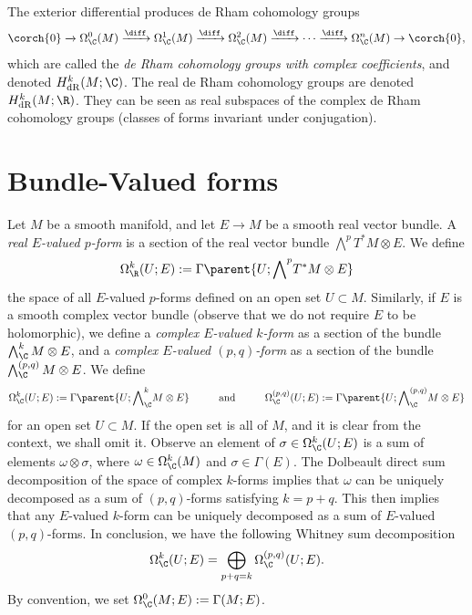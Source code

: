 The exterior differential produces de Rham cohomology groups
\[
\corch{0} \xrightarrow{} \Omega_\C^0(M) \xrightarrow{\diff} \Omega_\C^1(M) \xrightarrow{\diff} \Omega_\C^2(M) \xrightarrow{\diff}\cdots \xrightarrow{\diff} \Omega_\C^n(M) \to \corch{0}, 
\]
which are called the \textit{de Rham cohomology groups with complex coefficients}, and denoted \(H^k_{\mathrm{dR}}(M;\C)\). The real de Rham cohomology groups are denoted \(H^k_{\mathrm{dR}}(M;\R)\). They can be seen as real subspaces of the complex de Rham cohomology groups (classes of forms invariant under conjugation).

\section{Bundle-Valued forms} \label{section_bundle_valued_p_forms}
Let \(M\) be a smooth manifold, and let \(E\to M\) be a smooth real vector bundle. A \textit{real \(E\)-valued \(p\)-form} is a section of the real vector bundle \(\bigwedge^p T^*M \otimes E\). We define 
\[
\Omega^k_\R(U;E):=\Gamma\parent{U;{\bigwedge}^pT^*M\otimes E}
\] 
the space of all \(E\)-valued \(p\)-forms defined on an open set \(U \subset M\). Similarly, if \(E\) is a smooth complex vector bundle (observe that we do not require \(E\) to be holomorphic), we define a \textit{complex \(E\)-valued \(k\)-form} as a section of the bundle \(\bigwedge^k_\C M \otimes E\), and a \textit{complex \(E\)-valued \((p,q)\)-form} as a section of the bundle \(\bigwedge_\C^{(p,q)}M \otimes E\). We define 
\[
\Omega^k_\C(U;E):=\Gamma \parent{U; {\bigwedge}^k_\C M \otimes E} \hspace{1 cm} \text{and} \hspace{1 cm}
\Omega^{(p,q)}_\C(U;E):=\Gamma \parent{U;{\bigwedge}^{(p,q)}_\C M \otimes E}
\]
for an open set \(U \subset M\). If the open set is all of \(M\), and it is clear from the context, we shall omit it. Observe an element of \(\sigma \in \Omega_\C^{k}(U;E)\) is a sum of elements \(\omega \otimes \sigma\), where \(\omega \in \Omega_\C^{k}(M)\) and \(\sigma \in \Gamma(E)\). The Dolbeault direct sum decomposition of the space of complex \(k\)-forms implies that \(\omega\) can be uniquely decomposed as a sum of \((p,q)\)-forms satisfying \(k=p+q\). This then implies that any \(E\)-valued \(k\)-form can be uniquely decomposed as a sum of \(E\)-valued \((p,q)\)-forms. In conclusion, we have the following Whitney sum decomposition
\begin{equation} \label{eq_decomp_E_forms}
\Omega^k_\C(U; E)=\bigoplus_{p+q=k} \Omega_\C^{(p,q)}(U;E).
\end{equation}
By convention, we set \(\Omega_\C^0(M;E):=\Gamma(M;E)\). \\

